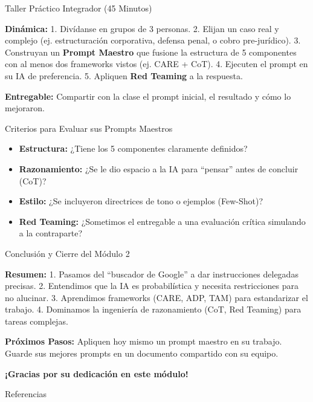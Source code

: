 \documentclass[aspectratio=169]{beamer}
\begin{document}
\begin{frame}[fragile]{Taller Práctico Integrador (45 Minutos)}


\textbf{Dinámica:}
1. Divídanse en grupos de 3 personas.
2. Elijan un caso real y complejo (ej. estructuración corporativa, defensa penal, o cobro pre-jurídico).
3. Construyan un \textbf{Prompt Maestro} que fusione la estructura de 5 componentes con al menos dos frameworks vistos (ej. CARE + CoT).
4. Ejecuten el prompt en su IA de preferencia.
5. Apliquen \textbf{Red Teaming} a la respuesta.

\textbf{Entregable:} Compartir con la clase el prompt inicial, el resultado y cómo lo mejoraron.

\end{frame}



\begin{frame}[fragile]{Criterios para Evaluar sus Prompts Maestros}


\begin{itemize}
  \item \textbf{Estructura:} ¿Tiene los 5 componentes claramente definidos?
  \item \textbf{Razonamiento:} ¿Se le dio espacio a la IA para ``pensar'' antes de concluir (CoT)?
  \item \textbf{Estilo:} ¿Se incluyeron directrices de tono o ejemplos (Few-Shot)?
  \item \textbf{Red Teaming:} ¿Sometimos el entregable a una evaluación crítica simulando a la contraparte?
\end{itemize}
\end{frame}



\begin{frame}[fragile]{Conclusión y Cierre del Módulo 2}


\textbf{Resumen:}
1. Pasamos del ``buscador de Google'' a dar instrucciones delegadas precisas.
2. Entendimos que la IA es probabilística y necesita restricciones para no alucinar.
3. Aprendimos frameworks (CARE, ADP, TAM) para estandarizar el trabajo.
4. Dominamos la ingeniería de razonamiento (CoT, Red Teaming) para tareas complejas.

\textbf{Próximos Pasos:} Apliquen hoy mismo un prompt maestro en su trabajo. Guarde sus mejores prompts en un documento compartido con su equipo.

\textbf{¡Gracias por su dedicación en este módulo!}
\end{frame}




\begin{frame}[allowframebreaks]{Referencias}
  
  
\end{frame}
\end{document}
